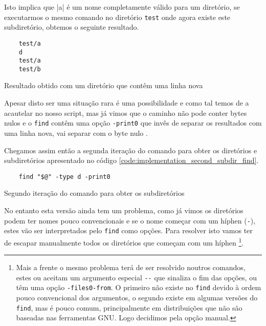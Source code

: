 Isto implica que \bashinline|a\nd| é um nome completamente válido para um diretório,
se executarmos o mesmo comando no diretório \Verb|test| onde agora existe este
subdiretório, obtemos o seguinte resultado.

\begin{listing}[H]
	\centering
	\begin{verbatim}
    test/a
    d
    test/a
    test/b
  \end{verbatim}
	\caption{Resultado obtido com um diretório que contêm uma linha nova}
\end{listing}

Apesar disto ser uma situação rara é uma possibilidade e como tal temos de a
acautelar no nosso script, mas já vimos que o caminho não pode conter bytes
nulos e o \Verb|find| contêm uma opção \Verb|-print0| que invês de separar os
resultados com uma linha nova, vai separar com o byte nulo \cite{find_man}.

Chegamos assim então a segunda iteração do comando para obter os diretórios e
subdiretórios apresentado no código \ref{code:implementation_second_subdir_find}.

\begin{listing}[H]
	\centering
	\begin{verbatim}
    find "$@" -type d -print0
  \end{verbatim}
	\caption{Segundo iteração do comando para obter os subdiretórios}
	\label{code:implementation_second_subdir_find}
\end{listing}

No entanto esta versão ainda tem um problema, como já vimos os diretórios podem
ter nomes pouco convencionais e se o nome começar com um híphen (\Verb|-|),
estes vão ser interpretados pelo \Verb|find| como opções. Para resolver isto
vamos ter de escapar manualmente todos os diretórios que começam com um híphen
\footnote{Mais a frente o mesmo problema terá de ser resolvido noutros comandos,
	estes ou aceitam um argumento especial \Verb|--| que sinaliza o fim das opções,
	ou têm uma opção \Verb|-files0-from|. O primeiro não existe no \Verb|find|
	devido à ordem pouco convencional dos argumentos, o segundo existe em algumas
	versões do \Verb|find|, mas é pouco comum, principalmente em distribuições que
	não são baseadas nas ferramentas GNU. Logo decidimos pela opção manual.}.

